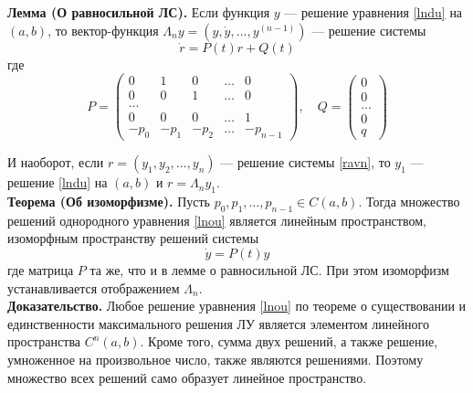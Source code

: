 \noindent \textbf{Лемма (О равносильной ЛС).} Если функция $y$ --- решение уравнения \eqref{lndu} на $(a,b)$, то вектор-функция $\Lambda_n y = (y, \dot{y}, \ldots, y^{(n-1)})$ --- решение системы
\begin{equation}
    \dot{r} = P(t)r + Q(t) \label{ravn}
\end{equation}
где
\begin{equation*}
    P = \begin{pmatrix}
        0    & 1    & 0    & \ldots & 0          \\
        0    & 0    & 1    & \ldots & 0          \\
        \ldots                                   \\
        0    & 0    & 0    & \ldots & 1          \\
        -p_0 & -p_1 & -p_2 & \ldots & -p_{n - 1}
    \end{pmatrix}, \quad Q = \begin{pmatrix}
        0      \\
        0      \\
        \ldots \\
        0      \\
        q
    \end{pmatrix}
\end{equation*}

И наоборот, если $r = (y_1, y_2, \ldots, y_n)$ --- решение системы \eqref{ravn}, то $y_1$ --- решение \eqref{lndu} на $(a,b)$ и $r = \Lambda_n y_1$.\\

\noindent \textbf{Теорема (Об изоморфизме).} Пусть $p_0, p_1, \ldots, p_{n-1} \in C(a,b)$. Тогда множество решений однородного уравнения \eqref{lnou} является линейным пространством, изоморфным пространству решений системы
\begin{equation}
    \dot{y} = P(t)y \label{izomorf}
\end{equation}
где матрица $P$ та же, что и в лемме о равносильной ЛС. При этом изоморфизм устанавливается отображением $\Lambda_n$.\\

\noindent \textbf{Доказательство.} Любое решение уравнения \eqref{lnou} по теореме о существовании и единственности максимального решения ЛУ является элементом линейного пространства $C^n(a,b)$. Кроме того, сумма двух решений, а также решение, умноженное на произвольное число, также являются решениями. Поэтому множество всех решений само образует линейное пространство.

